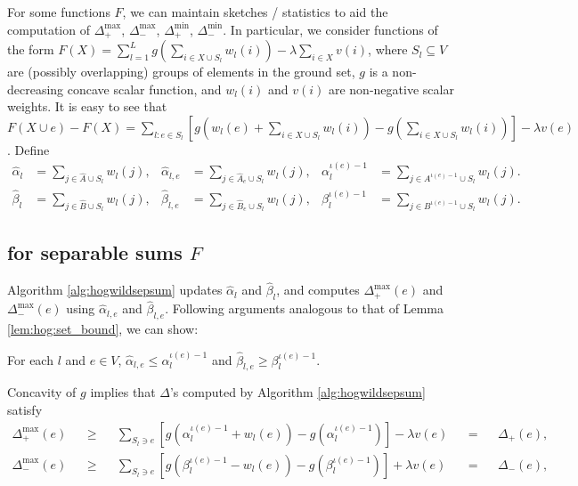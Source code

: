 For some functions $F$, we can maintain sketches / statistics to aid the computation of $\Delta_+^{\max}$, $\Delta_-^{\max}$, $\Delta_+^{\min}$, $\Delta_-^{\min}$.
In particular, we consider functions of the form
$F(X) = \sum_{l=1}^L g\left(\sum_{i\in X\cup S_l} w_l(i)\right) - \lambda\sum_{i\in X} v(i)$,
where $S_l \subseteq V$ are (possibly overlapping) groups of elements in the ground set, $g$ is a non-decreasing concave scalar function, and $w_l(i)$ and $v(i)$ are non-negative scalar weights.
It is easy to see that
$
F(X \cup e) - F(X) = \sum_{l: e\in S_l} \left[g\left(w_l(e) + \sum_{i\in X\cup S_l} w_l(i)\right) - g\left(\sum_{i\in X\cup S_l} w_l(i)\right)\right] - \lambda v(e)$.
Define
%
%
\begin{align*}
  \hat\alpha_l              &= \sum_{j\in \hat{A}\cup S_l} w_l(j),
& \hat\alpha_{l,e}          &= \sum_{j\in \hat{A}_e\cup S_l} w_l(j),
& \alpha_l^{\iota(e)-1} &= \sum_{j\in A^{\iota(e)-1}\cup S_l} w_l(j).\\
  \hat\beta_l              &= \sum_{j\in \hat{B}\cup S_l} w_l(j),
& \hat\beta_{l,e}          &= \sum_{j\in \hat{B}_e\cup S_l} w_l(j),
& \beta_l^{\iota(e)-1} &= \sum_{j\in B^{\iota(e)-1}\cup S_l} w_l(j).
\end{align*}


\subsection{\hogwild{} for separable sums $F$}
Algorithm \ref{alg:hogwildsepsum} updates $\hat\alpha_l$ and $\hat\beta_l$, and computes $\Delta_+^{\max}(e)$ and $\Delta_-^{\max}(e)$ using $\hat\alpha_{l,e}$ and $\hat\beta_{l,e}$.
Following arguments analogous to that of Lemma \ref{lem:hog:set_bound}, we can show:

\begin{lem} For each $l$ and $e\in V$, $\hat\alpha_{l,e} \leq \alpha_l^{\iota(e)-1}$ and $\hat\beta_{l,e} \geq \beta_l^{\iota(e)-1}$.
\end{lem}

\begin{cor} Concavity of $g$ implies that $\Delta$'s computed by Algorithm \ref{alg:hogwildsepsum} satisfy
\begin{align*}
\Delta_+^{\max}(e)
&&\geq&& \sum_{S_l\ni e} \left[g(\alpha_l^{\iota(e)-1} + w_l(e)) - g(\alpha_l^{\iota(e)-1})\right] - \lambda v(e)
&&=&& \Delta_+(e),\\
\Delta_-^{\max}(e)
&&\geq&& \sum_{S_l\ni e} \left[g(\beta_l^{\iota(e)-1} - w_l(e)) - g(\beta_l^{\iota(e)-1})\right] + \lambda v(e)
&&=&& \Delta_-(e),
\end{align*}
\end{cor}

